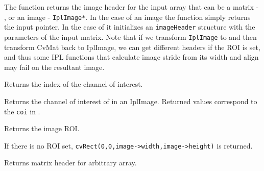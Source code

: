 The function returns the image header for the input array
that can be a matrix - , or an image - \texttt{IplImage*}. In
the case of an image the function simply returns the input pointer. In the
case of  it initializes an \texttt{imageHeader} structure
with the parameters of the input matrix. Note that if we transform
\texttt{IplImage} to  and then transform CvMat back to
IplImage, we can get different headers if the ROI is set, and thus some
IPL functions that calculate image stride from its width and align may
fail on the resultant image.

Returns the index of the channel of interest. 


\begin{description}
\end{description}

Returns the channel of interest of in an IplImage. Returned values correspond to the \texttt{coi} in .

Returns the image ROI.


\begin{description}
\end{description}

If there is no ROI set, \texttt{cvRect(0,0,image->width,image->height)} is returned.

Returns matrix header for arbitrary array.


\begin{description}
\ifC
{}
\fi
{}
\end{description}

